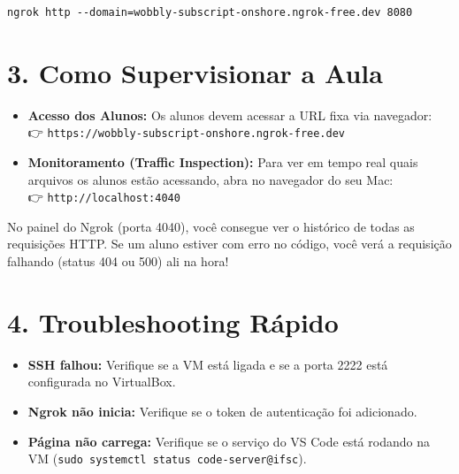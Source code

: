 \documentclass[12pt,a4paper]{article}
\begin{document}
\begin{boxCodigo}
\begin{verbatim}
ngrok http --domain=wobbly-subscript-onshore.ngrok-free.dev 8080
\end{verbatim}
\end{boxCodigo}

\section*{3. Como Supervisionar a Aula}

\begin{itemize}
    \item \textbf{Acesso dos Alunos:} Os alunos devem acessar a URL fixa via navegador:\\
    👉 \texttt{https://wobbly-subscript-onshore.ngrok-free.dev}
    
    \item \textbf{Monitoramento (Traffic Inspection):} Para ver em tempo real quais arquivos os alunos estão acessando, abra no navegador do seu Mac:\\
    👉 \texttt{http://localhost:4040}
\end{itemize}

\begin{tcolorbox}[colback=mostarda!10, colframe=mostarda, title=Dica de Ouro]
No painel do Ngrok (porta 4040), você consegue ver o histórico de todas as requisições HTTP. Se um aluno estiver com erro no código, você verá a requisição falhando (status 404 ou 500) ali na hora!
\end{tcolorbox}

\section*{4. Troubleshooting Rápido}

\begin{itemize}
    \item \textbf{SSH falhou:} Verifique se a VM está ligada e se a porta 2222 está configurada no VirtualBox.
    \item \textbf{Ngrok não inicia:} Verifique se o token de autenticação foi adicionado.
    \item \textbf{Página não carrega:} Verifique se o serviço do VS Code está rodando na VM (\texttt{sudo systemctl status code-server@ifsc}).
\end{itemize}
\end{document}

